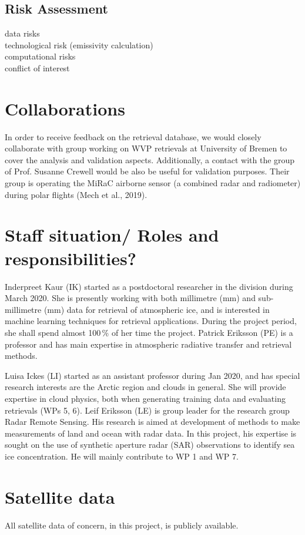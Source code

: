 \documentclass[12pt,oneside,a4paper]{article}
\begin{document}
\subsection{Risk Assessment}
%
\label{sec:risk}
data risks\\
technological risk (emissivity calculation)\\
computational risks\\
conflict of interest
  

\section{Collaborations}

In order to receive feedback on the retrieval database, we would closely collaborate with group working on WVP retrievals at University of Bremen to cover the analysis and validation aspects. Additionally, a contact with the group of Prof. Susanne Crewell would be also be useful for validation purposes. Their group is operating the MiRaC airborne sensor (a combined radar and radiometer) during polar flights (Mech et al., 2019).

\section{Staff situation/ Roles and responsibilities?}
\label{sec:staff}
%
Inderpreet Kaur (IK) started as a postdoctoral researcher in the division during March 2020.  She is presently working with both millimetre (mm) and sub-millimetre (mm) data for retrieval of atmospheric ice, and is interested in machine learning techniques for retrieval applications. During the project period, she shall spend almost 100\,\% of her time the project.
Patrick Eriksson (PE) is a professor and has main expertise in atmospheric radiative transfer and retrieval methods. 

Luisa Ickes (LI) started as an assistant professor during Jan 2020, and has special research interests are the Arctic region and clouds in general. She will provide expertise in cloud physics, both when generating training data and evaluating retrievals (WPs 5, 6). Leif Eriksson (LE) is group leader for the research group Radar Remote Sensing. His research is aimed at development of methods to make measurements of land and ocean with radar data. In this project, his expertise is sought on the use of synthetic aperture radar (SAR) observations to identify sea ice concentration. He will mainly contribute to WP 1 and WP 7. 

\section{Satellite data}
%
All satellite data of concern, in this project, is publicly available. 

{\footnotesize
	
}
\end{document}
